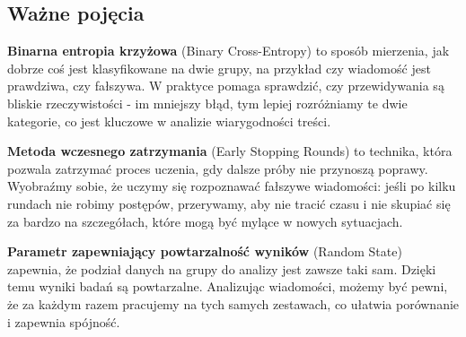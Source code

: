 \subsection{Ważne pojęcia}

\textbf{Binarna entropia krzyżowa} (Binary Cross-Entropy) to sposób mierzenia, jak dobrze coś jest klasyfikowane na dwie grupy, na przykład czy wiadomość jest prawdziwa, czy fałszywa. W praktyce pomaga sprawdzić, czy przewidywania są bliskie rzeczywistości - im mniejszy błąd, tym lepiej rozróżniamy te dwie kategorie, co jest kluczowe w analizie wiarygodności treści.

\textbf{Metoda wczesnego zatrzymania} (Early Stopping Rounds) to technika, która pozwala zatrzymać proces uczenia, gdy dalsze próby nie przynoszą poprawy. Wyobraźmy sobie, że uczymy się rozpoznawać fałszywe wiadomości: jeśli po kilku rundach nie robimy postępów, przerywamy, aby nie tracić czasu i nie skupiać się za bardzo na szczegółach, które mogą być mylące w nowych sytuacjach.

\textbf{Parametr zapewniający powtarzalność wyników} (Random State) zapewnia, że podział danych na grupy do analizy jest zawsze taki sam. Dzięki temu wyniki badań są powtarzalne. Analizując wiadomości, możemy być pewni, że za każdym razem pracujemy na tych samych zestawach, co ułatwia porównanie i zapewnia spójność.